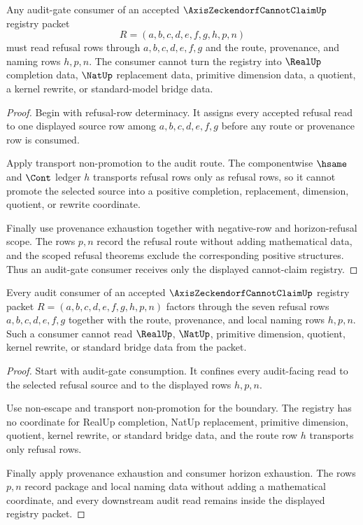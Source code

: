 \begin{theorem}
\label{thm:axis-zeckendorf-cannot-claim-audit-gate-consumption}
Any audit-gate consumer of an accepted $\AxisZeckendorfCannotClaimUp$ registry packet
$$
R=(a,b,c,d,e,f,g,h,p,n)
$$
must read refusal rows through $a,b,c,d,e,f,g$ and the route, provenance, and naming rows $h,p,n$. The consumer cannot turn the registry into $\RealUp$ completion data, $\NatUp$ replacement data, primitive dimension data, a quotient, a kernel rewrite, or standard-model bridge data.
\end{theorem}
\begin{proof}
Begin with refusal-row determinacy. It assigns every accepted refusal read to one displayed source row among $a,b,c,d,e,f,g$ before any route or provenance row is consumed.

Apply transport non-promotion to the audit route. The componentwise $\hsame$ and $\Cont$ ledger $h$ transports refusal rows only as refusal rows, so it cannot promote the selected source into a positive completion, replacement, dimension, quotient, or rewrite coordinate.

Finally use provenance exhaustion together with negative-row and horizon-refusal scope. The rows $p,n$ record the refusal route without adding mathematical data, and the scoped refusal theorems exclude the corresponding positive structures. Thus an audit-gate consumer receives only the displayed cannot-claim registry.
\end{proof}

\begin{theorem}
\label{thm:axis-zeckendorf-cannot-claim-audit-gate-boundary}
Every audit consumer of an accepted $\AxisZeckendorfCannotClaimUp$ registry packet $R=(a,b,c,d,e,f,g,h,p,n)$ factors through the seven refusal rows $a,b,c,d,e,f,g$ together with the route, provenance, and local naming rows $h,p,n$. Such a consumer cannot read $\RealUp$, $\NatUp$, primitive dimension, quotient, kernel rewrite, or standard bridge data from the packet.
\end{theorem}
\begin{proof}
Start with audit-gate consumption. It confines every audit-facing read to the selected refusal source and to the displayed rows $h,p,n$.

Use non-escape and transport non-promotion for the boundary. The registry has no coordinate for RealUp completion, NatUp replacement, primitive dimension, quotient, kernel rewrite, or standard bridge data, and the route row $h$ transports only refusal rows.

Finally apply provenance exhaustion and consumer horizon exhaustion. The rows $p,n$ record package and local naming data without adding a mathematical coordinate, and every downstream audit read remains inside the displayed registry packet.
\end{proof}

